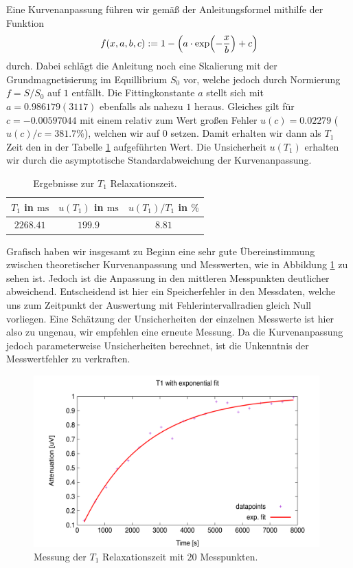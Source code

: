 \documentclass[../../main.tex]{subfiles}
\begin{document}
    Eine Kurvenanpassung führen wir gemäß der Anleitungsformel mithilfe der Funktion 
    \[
        f(x,a,b,c) := 1 - \left(a\cdot\exp(-\frac{x}{b}) + c\right)
    \]
    durch. Dabei schlägt die Anleitung noch eine Skalierung mit der Grundmagnetisierung im Equillibrium $S_0$ vor, welche jedoch durch Normierung $f = S/S_0$ auf $1$ entfällt. Die Fittingkonstante $a$ stellt sich mit $a = 0.986179(3117)$ ebenfalls als nahezu $1$ heraus. Gleiches gilt für $c = -0.00597044$ mit einem relativ zum Wert großen Fehler $u(c) = 0.02279$ ($u(c)/c = 381.7\si{\percent}$), welchen wir auf $0$ setzen. Damit erhalten wir dann als $T_1$ Zeit den in der Tabelle \ref{tab:8:T1} aufgeführten Wert. Die Unsicherheit $u(T_1)$ erhalten wir durch die asymptotische Standardabweichung der Kurvenanpassung. 

    \begin{table}[H]
        \centering
        \begin{tabular}{c|cc}
            \hline
            $T_1$ in $\si{\ms}$ & $u(T_1)$ in $\si{\ms}$ & $u(T_1)/T_1$ in $\si{\percent}$ \\
            \hline\hline
            $2268.41$ & $199.9$ & $8.81$ \\
            \hline
        \end{tabular}
        \caption{Ergebnisse zur $T_1$ Relaxationszeit.}
        \label{tab:8:T1}
    \end{table}
    Grafisch haben wir insgesamt zu Beginn eine sehr gute Übereinstimmung zwischen theoretischer Kurvenanpassung und Messwerten, wie in Abbildung \ref{fig:8:T1-Bp-20steps_exp} zu sehen ist. Jedoch ist die Anpassung in den mittleren Messpunkten deutlicher abweichend. Entscheidend ist hier ein Speicherfehler in den Messdaten, welche uns zum Zeitpunkt der Auswertung mit Fehlerintervallradien gleich Null vorliegen. Eine Schätzung der Unsicherheiten der einzelnen Messwerte ist hier also zu ungenau, wir empfehlen eine erneute Messung. Da die Kurvenanpassung jedoch parameterweise Unsicherheiten berechnet, ist die Unkenntnis der Messwertfehler zu verkraften.
    \begin{figure}[H]
        \centering
        \includegraphics[width=11cm]{Bilddateien/8/T1-Bp-20steps_exp.png}
        \caption{Messung der $T_1$ Relaxationszeit mit $20$ Messpunkten.}
        \label{fig:8:T1-Bp-20steps_exp}
    \end{figure}
\end{document}
